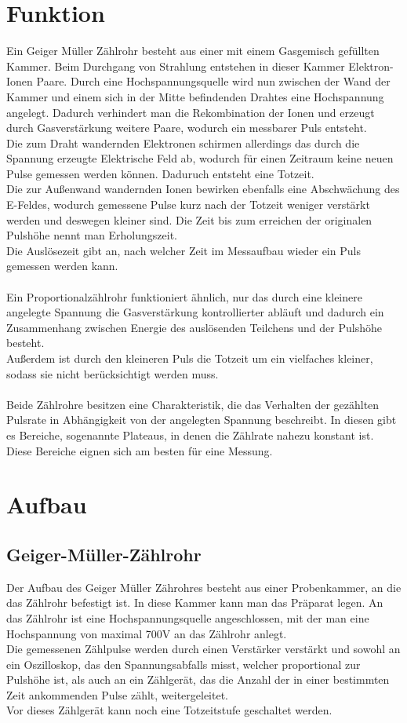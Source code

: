 \documentclass[12pt,a4paper]{article}
\begin{document}
\section{Funktion}
Ein Geiger Müller Zählrohr besteht aus einer mit einem Gasgemisch gefüllten Kammer. Beim Durchgang von Strahlung entstehen in dieser Kammer Elektron-Ionen Paare. Durch eine  Hochspannungsquelle wird nun zwischen der Wand der Kammer und einem sich in der Mitte befindenden Drahtes eine Hochspannung angelegt. Dadurch verhindert man die Rekombination der Ionen und erzeugt durch Gasverstärkung weitere Paare, wodurch ein messbarer Puls entsteht.\\
Die zum Draht wandernden Elektronen schirmen allerdings das durch die Spannung erzeugte Elektrische Feld ab, wodurch für einen Zeitraum keine neuen Pulse gemessen werden können. Daduruch entsteht eine Totzeit.\\
Die zur Außenwand wandernden Ionen bewirken ebenfalls eine Abschwächung des E-Feldes, wodurch gemessene Pulse kurz nach der Totzeit weniger verstärkt werden und deswegen kleiner sind. Die Zeit bis zum erreichen der originalen Pulshöhe nennt man Erholungszeit.\\
Die Auslösezeit gibt an, nach welcher Zeit im Messaufbau wieder ein Puls gemessen werden kann.\\
\\
Ein Proportionalzählrohr funktioniert ähnlich, nur das durch eine kleinere angelegte Spannung die Gasverstärkung kontrollierter abläuft und dadurch ein Zusammenhang zwischen Energie des auslösenden Teilchens und der Pulshöhe besteht.\\
Außerdem ist durch den kleineren Puls die Totzeit um ein vielfaches kleiner, sodass sie nicht berücksichtigt werden muss.\\
\\
Beide Zählrohre besitzen eine Charakteristik, die das Verhalten der gezählten Pulsrate in Abhängigkeit von der angelegten Spannung beschreibt. In diesen gibt es Bereiche, sogenannte Plateaus, in denen die Zählrate nahezu konstant ist. Diese Bereiche eignen sich am besten für eine Messung.

\section{Aufbau}
\subsection{Geiger-Müller-Zählrohr}
Der Aufbau des Geiger Müller Zährohres besteht aus einer Probenkammer, an die das Zählrohr befestigt ist. In diese Kammer kann man das Präparat legen. An das Zählrohr ist eine Hochspannungsquelle angeschlossen, mit der man eine Hochspannung von maximal 700V an das Zählrohr anlegt.\\
Die gemessenen Zählpulse werden durch einen Verstärker verstärkt und sowohl an ein Oszilloskop, das den Spannungsabfalls misst, welcher proportional zur Pulshöhe ist, als auch an ein Zählgerät, das die Anzahl der in einer bestimmten Zeit ankommenden Pulse zählt, weitergeleitet.\\
Vor dieses Zählgerät kann noch eine Totzeitstufe geschaltet werden.
\end{document}
